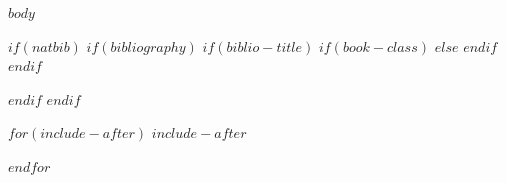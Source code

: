 \documentclass[10pt,a5paper]{book}
\begin{document}
\pagestyle{mainstyle}
$body$

\hypersetup{linkcolor=$if(toccolor)$$toccolor$$else$black$endif$}
\setcounter{tocdepth}{0} %
\tableofcontents



$if(natbib)$
$if(bibliography)$
$if(biblio-title)$
$if(book-class)$
\renewcommand\bibname{$biblio-title$}
$else$
\renewcommand\refname{$biblio-title$}
$endif$
$endif$


$endif$
$endif$

$for(include-after)$
$include-after$

$endfor$
\end{document}
